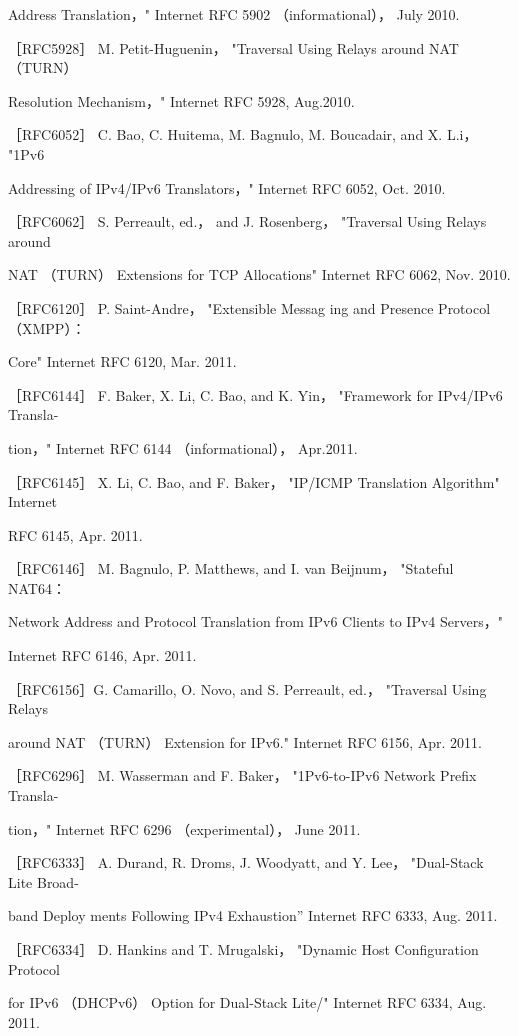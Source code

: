 Address Translation，" Internet RFC 5902 （informational）， July 2010.

［RFC5928］ M. Petit-Huguenin， "Traversal Using Relays around NAT （TURN）

Resolution Mechanism，" Internet RFC 5928, Aug.2010.

［RFC6052］ C. Bao, C. Huitema, M. Bagnulo, M. Boucadair, and X. L.i， "1Pv6

Addressing of IPv4/IPv6 Translators，" Internet RFC 6052, Oct. 2010.

［RFC6062］ S. Perreault, ed.， and J. Rosenberg， "Traversal Using Relays around

NAT （TURN） Extensions for TCP Allocations" Internet RFC 6062, Nov. 2010.

［RFC6120］ P. Saint-Andre， "Extensible Messag ing and Presence Protocol （XMPP）：

Core" Internet RFC 6120, Mar. 2011.

［RFC6144］ F. Baker, X. Li, C. Bao, and K. Yin， "Framework for IPv4/IPv6 Transla-

tion，" Internet RFC 6144 （informational）， Apr.2011.

［RFC6145］ X. Li, C. Bao, and F. Baker， "IP/ICMP Translation Algorithm" Internet

RFC 6145, Apr. 2011.

［RFC6146］ M. Bagnulo, P. Matthews, and I. van Beijnum， "Stateful NAT64：

Network Address and Protocol Translation from IPv6 Clients to IPv4 Servers，"

Internet RFC 6146, Apr. 2011.

［RFC6156］G. Camarillo, O. Novo, and S. Perreault, ed.， "Traversal Using Relays

around NAT （TURN） Extension for IPv6." Internet RFC 6156, Apr. 2011.

［RFC6296］ M. Wasserman and F. Baker， "1Pv6-to-IPv6 Network Prefix Transla-

tion，" Internet RFC 6296 （experimental）， June 2011.

［RFC6333］ A. Durand, R. Droms, J. Woodyatt, and Y. Lee， "Dual-Stack Lite Broad-

band Deploy ments Following IPv4 Exhaustion” Internet RFC 6333, Aug. 2011.

［RFC6334］ D. Hankins and T. Mrugalski， "Dynamic Host Configuration Protocol

for IPv6 （DHCPv6） Option for Dual-Stack Lite/" Internet RFC 6334, Aug. 2011.

